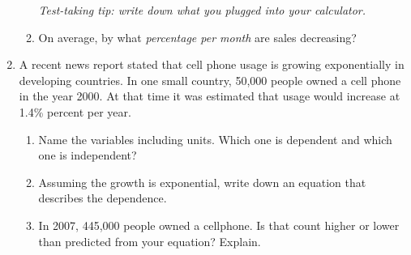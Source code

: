 \documentclass[12pt]{article}
\begin{document}
\begin{enumerate}
\begin{enumerate}
\emph{Test-taking tip:  write down what you plugged into your calculator.}
\vfill
\vfill
\item On average, by what \textit{percentage per month} are sales decreasing?
\vfill
\end{enumerate}

\hrulefill

\item A recent news report stated that cell phone usage is growing exponentially in developing countries.  In one small country, 50,000 people owned a cell phone in the year 2000.  At that time it was estimated that usage would increase at 1.4\% percent per year.

\begin{enumerate}
\item Name the variables including units.  Which one is dependent and which one is independent?
\vfill
\item Assuming the growth is exponential, write down an equation that describes the dependence.
\vfill
\item In 2007, 445,000 people owned a cellphone.  Is that count higher or lower than predicted from your equation?  Explain.
\vfill
\end{enumerate}


\end{enumerate}
\end{document}

